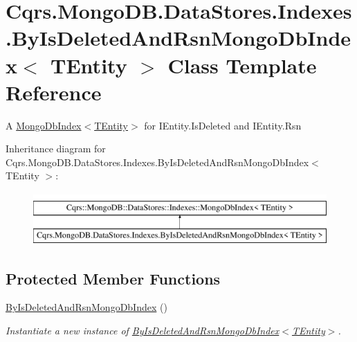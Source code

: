 \hypertarget{classCqrs_1_1MongoDB_1_1DataStores_1_1Indexes_1_1ByIsDeletedAndRsnMongoDbIndex}{}\section{Cqrs.\+Mongo\+D\+B.\+Data\+Stores.\+Indexes.\+By\+Is\+Deleted\+And\+Rsn\+Mongo\+Db\+Index$<$ T\+Entity $>$ Class Template Reference}
\label{classCqrs_1_1MongoDB_1_1DataStores_1_1Indexes_1_1ByIsDeletedAndRsnMongoDbIndex}


A \hyperlink{classCqrs_1_1MongoDB_1_1DataStores_1_1Indexes_1_1MongoDbIndex_a61f4b17dd968f92e81562c70ae062a89_a61f4b17dd968f92e81562c70ae062a89}{Mongo\+Db\+Index$<$\+T\+Entity$>$} for I\+Entity.\+Is\+Deleted and I\+Entity.\+Rsn  


Inheritance diagram for Cqrs.\+Mongo\+D\+B.\+Data\+Stores.\+Indexes.\+By\+Is\+Deleted\+And\+Rsn\+Mongo\+Db\+Index$<$ T\+Entity $>$\+:\begin{figure}[H]
\begin{center}
\leavevmode
\includegraphics[height=2.000000cm]{classCqrs_1_1MongoDB_1_1DataStores_1_1Indexes_1_1ByIsDeletedAndRsnMongoDbIndex}
\end{center}
\end{figure}
\subsection*{Protected Member Functions}
\begin{DoxyCompactItemize}
\item 
\hyperlink{classCqrs_1_1MongoDB_1_1DataStores_1_1Indexes_1_1ByIsDeletedAndRsnMongoDbIndex_ab558793f6a92b0a32bb6432268271a28_ab558793f6a92b0a32bb6432268271a28}{By\+Is\+Deleted\+And\+Rsn\+Mongo\+Db\+Index} ()
\begin{DoxyCompactList}\small\item\em Instantiate a new instance of \hyperlink{classCqrs_1_1MongoDB_1_1DataStores_1_1Indexes_1_1ByIsDeletedAndRsnMongoDbIndex_ab558793f6a92b0a32bb6432268271a28_ab558793f6a92b0a32bb6432268271a28}{By\+Is\+Deleted\+And\+Rsn\+Mongo\+Db\+Index$<$\+T\+Entity$>$}. \end{DoxyCompactList}\end{DoxyCompactItemize}
